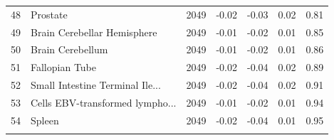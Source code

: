 \documentclass{article}
\begin{document}
\begin{table}[h!]
\begin{tabular}{rlrrrrr}
  48 & Prostate & 2049 & -0.02 & -0.03 & 0.02 & 0.81 \\ 
  49 & Brain Cerebellar Hemisphere & 2049 & -0.01 & -0.02 & 0.01 & 0.85 \\ 
  50 & Brain Cerebellum & 2049 & -0.01 & -0.02 & 0.01 & 0.86 \\ 
  51 & Fallopian Tube & 2049 & -0.02 & -0.04 & 0.02 & 0.89 \\ 
  52 & Small Intestine Terminal Ile... & 2049 & -0.02 & -0.04 & 0.02 & 0.91 \\ 
  53 & Cells EBV-transformed lympho... & 2049 & -0.01 & -0.02 & 0.01 & 0.94 \\ 
  54 & Spleen & 2049 & -0.02 & -0.04 & 0.01 & 0.95 \\ 
   \hline
 \vspace{-151pt}
\end{tabular}
\end{table}

\begin{table}[h!]
\renewcommand{\thetable}{S\arabic{table}}
\centering
\caption{Prediciton results for 74,000 top independent loci in each method}
\end{table}
\end{document}
